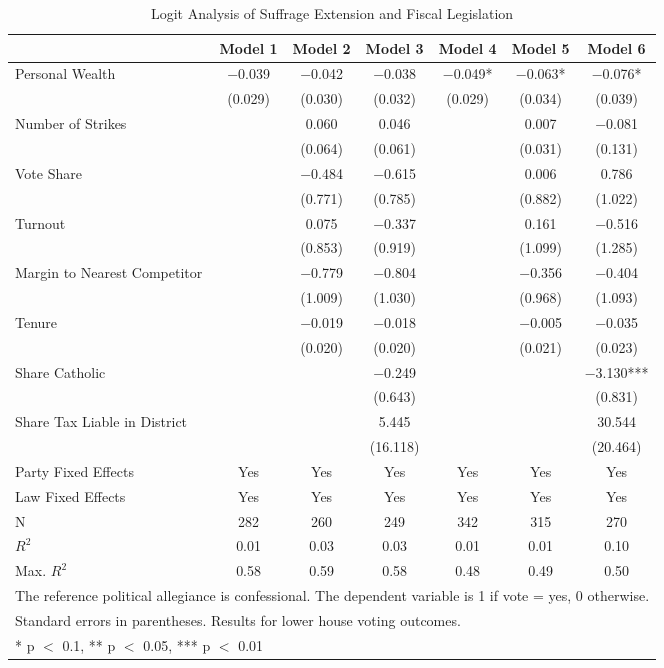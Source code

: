 \begin{table}

\caption{\label{tab:logit_suffrage_fiscal}Logit Analysis of Suffrage Extension and Fiscal Legislation}
\centering
\begin{tabular}[t]{lcccccc}
\toprule
  & Model 1 & Model 2 & Model 3 & Model 4 & Model 5 & Model 6\\
\midrule
Personal Wealth & \num{-0.039} & \num{-0.042} & \num{-0.038} & \num{-0.049}* & \num{-0.063}* & \num{-0.076}*\\
 & (\num{0.029}) & (\num{0.030}) & (\num{0.032}) & (\num{0.029}) & (\num{0.034}) & (\num{0.039})\\
Number of Strikes &  & \num{0.060} & \num{0.046} &  & \num{0.007} & \num{-0.081}\\
 &  & (\num{0.064}) & (\num{0.061}) &  & (\num{0.031}) & (\num{0.131})\\
Vote Share &  & \num{-0.484} & \num{-0.615} &  & \num{0.006} & \num{0.786}\\
 &  & (\num{0.771}) & (\num{0.785}) &  & (\num{0.882}) & (\num{1.022})\\
Turnout &  & \num{0.075} & \num{-0.337} &  & \num{0.161} & \num{-0.516}\\
 &  & (\num{0.853}) & (\num{0.919}) &  & (\num{1.099}) & (\num{1.285})\\
Margin to Nearest Competitor &  & \num{-0.779} & \num{-0.804} &  & \num{-0.356} & \num{-0.404}\\
 &  & (\num{1.009}) & (\num{1.030}) &  & (\num{0.968}) & (\num{1.093})\\
Tenure &  & \num{-0.019} & \num{-0.018} &  & \num{-0.005} & \num{-0.035}\\
 &  & (\num{0.020}) & (\num{0.020}) &  & (\num{0.021}) & (\num{0.023})\\
Share Catholic &  &  & \num{-0.249} &  &  & \num{-3.130}***\\
 &  &  & (\num{0.643}) &  &  & (\num{0.831})\\
Share Tax Liable in District &  &  & \num{5.445} &  &  & \num{30.544}\\
 &  &  & (\num{16.118}) &  &  & (\num{20.464})\\
\midrule
Party Fixed Effects & Yes & Yes & Yes & Yes & Yes & Yes\\
Law Fixed Effects & Yes & Yes & Yes & Yes & Yes & Yes\\
N & \num{282} & \num{260} & \num{249} & \num{342} & \num{315} & \num{270}\\
$R^2$ & \num{0.01} & \num{0.03} & \num{0.03} & \num{0.01} & \num{0.01} & \num{0.10}\\
Max. $R^2$ & \num{0.58} & \num{0.59} & \num{0.58} & \num{0.48} & \num{0.49} & \num{0.50}\\
\bottomrule
\multicolumn{7}{l}{\rule{0pt}{1em}The reference political allegiance is confessional. The dependent variable is 1 if vote = yes, 0 otherwise.}\\
\multicolumn{7}{l}{\rule{0pt}{1em}Standard errors in parentheses. Results for lower house voting outcomes.}\\
\multicolumn{7}{l}{\rule{0pt}{1em}* p $<$ 0.1, ** p $<$ 0.05, *** p $<$ 0.01}\\
\end{tabular}
\end{table}
